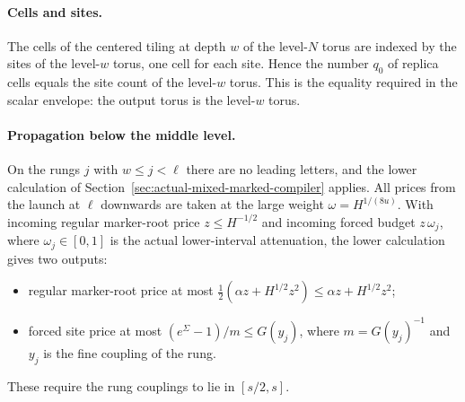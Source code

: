 \paragraph{Cells and sites.}
The cells of the centered tiling at depth $w$ of the level-$N$ torus are
indexed by the sites of the level-$w$ torus, one cell for each site.
Hence the number $q_0$ of replica cells equals the site count of the
level-$w$ torus. This is the equality required in the scalar envelope:
the output torus is the level-$w$ torus.

\paragraph{Propagation below the middle level.}
On the rungs $j$ with $w\le j<\ell$ there are no leading letters, and the
lower calculation of Section~\ref{sec:actual-mixed-marked-compiler}
applies. All prices from the launch at $\ell$ downwards are taken at the
large weight $\omega=H^{1/(8u)}$. With incoming regular marker-root price
$z\le H^{-1/2}$ and incoming forced budget $z\,\omega_j$, where
$\omega_j\in[0,1]$ is the actual lower-interval attenuation, the lower
calculation gives two outputs:
\begin{itemize}
\item regular marker-root price at most
 $\tfrac12(\alpha z+H^{1/2}z^2)\le\alpha z+H^{1/2}z^2$;
\item forced site price at most $(e^{\Sigma}-1)/m\le G(y_j)$, where
 $m=G(y_j)^{-1}$ and $y_j$ is the fine coupling of the rung.
\end{itemize}
These require the rung couplings to lie in $[s/2,s]$.

